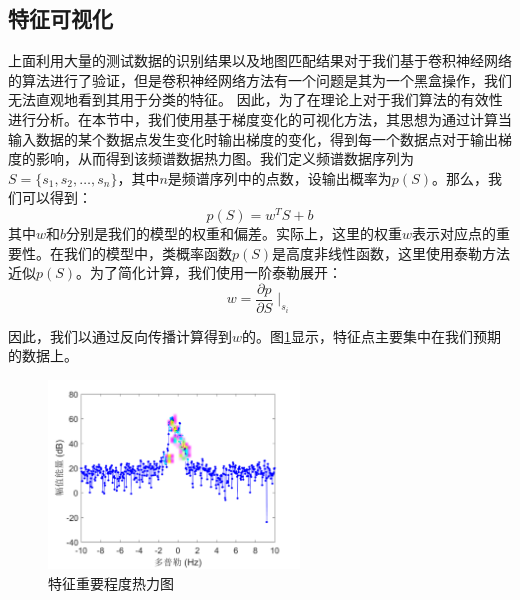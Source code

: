 \subsection{特征可视化}

上面利用大量的测试数据的识别结果以及地图匹配结果对于我们基于卷积神经网络的算法进行了验证，但是卷积神经网络方法有一个问题是其为一个黑盒操作，我们无法直观地看到其用于分类的特征。
因此，为了在理论上对于我们算法的有效性进行分析。在本节中，我们使用基于梯度变化的可视化方法，其思想为通过计算当输入数据的某个数据点发生变化时输出梯度的变化，得到每一个数据点对于输出梯度的影响，从而得到该频谱数据热力图。我们定义频谱数据序列为$ S = \{s_1, s_2, \dots,s_n\} $，其中$n$是频谱序列中的点数，设输出概率为$p(S)$。那么，我们可以得到：
\begin{equation}
	p(S) = w^TS+b
	\label{equ:ps}
\end{equation}
其中$ w $和$ b $分别是我们的模型的权重和偏差。实际上，这里的权重$ w $表示对应点的重要性。在我们的模型中，类概率函数$p(S)$是高度非线性函数，这里使用泰勒方法近似$p(S)$。为了简化计算，我们使用一阶泰勒展开：
\begin{equation}
	w = \frac{\partial{p}}{\partial{S}}{\mid}_{s_i}
	\label{equ:w}
\end{equation}

因此，我们以通过反向传播计算得到$ w $的。图\ref{fig:vis}显示，特征点主要集中在我们预期的数据上。
\begin{figure}[H]
	\centering
	\includegraphics[width=6.67cm]{figures/othr/heatmap}
	\caption{特征重要程度热力图}
	\label{fig:vis}
\end{figure}


